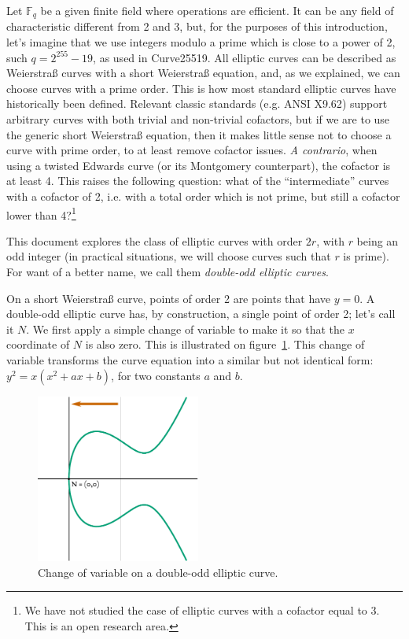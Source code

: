 \documentclass{llncs}
\newcommand{\bF}{\mathbb{F}}
\begin{document}
Let $\bF_q$ be a given finite field where operations are efficient. It
can be any field of characteristic different from 2 and 3, but, for the
purposes of this introduction, let's imagine that we use integers modulo
a prime which is close to a power of 2, such $q = 2^{255}-19$, as used
in Curve25519\cite{Ber2006}. All elliptic curves can be described as
Weierstraß curves with a short Weierstraß equation, and, as we
explained, we can choose curves with a prime order. This is how most
standard elliptic curves have historically been defined. Relevant
classic standards (e.g. ANSI X9.62\cite{X962}) support arbitrary curves
with both trivial and non-trivial cofactors, but if we are to use the
generic short Weierstraß equation, then it makes little sense not to
choose a curve with prime order, to at least remove cofactor issues.
\emph{A contrario}, when using a twisted Edwards curve (or its
Montgomery counterpart), the cofactor is at least 4. This raises the
following question: what of the ``intermediate'' curves with a cofactor
of 2, i.e. with a total order which is not prime, but still a cofactor
lower than 4?\footnote{We have not studied the case of elliptic curves
with a cofactor equal to 3. This is an open research area.}

This document explores the class of elliptic curves with order $2r$,
with $r$ being an odd integer (in practical situations, we will choose
curves such that $r$ is prime). For want of a better name, we call
them \emph{double-odd elliptic curves}.

On a short Weierstraß curve, points of order 2 are points that have $y =
0$. A double-odd elliptic curve has, by construction, a single point of
order 2; let's call it $N$. We first apply a simple change of variable
to make it so that the $x$ coordinate of $N$ is also zero. This is
illustrated on figure~\ref{fig:curve2-changeofvariable}. This change of
variable transforms the curve equation into a similar but not identical
form: $y^2 = x(x^2 + ax + b)$, for two constants $a$ and $b$.

\begin{figure}
\begin{center}
    \includegraphics[width=0.48\textwidth]{curve2-changeofvariable.pdf}
\end{center}
\caption{\label{fig:curve2-changeofvariable}Change of variable on a
double-odd elliptic curve.}
\end{figure}
\end{document}
